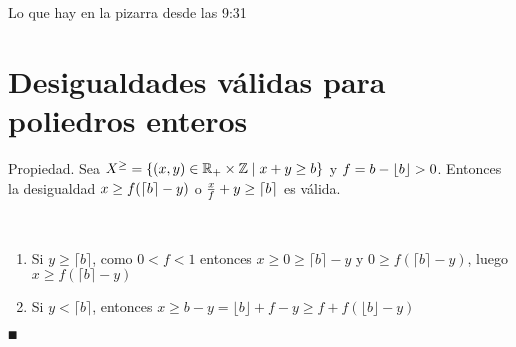 \documentclass[MIOP.tex]{subfiles}
\begin{document}
Lo que hay en la pizarra desde las 9:31


\section{Desigualdades válidas para poliedros enteros}
\begin{propi}
Propiedad. Sea $X^{\geq}=\{(x,y)\in\mathbb{R}_+\times \mathbb{Z} \mid x+y \geq b\}$ y $f= b-\left\lfloor{b}\right\rfloor>0$. Entonces la desigualdad $x\geq f(\left\lceil{b}\right\rceil-y)$ o $\frac{x}{f}+y\geq \left\lceil{b}\right\rceil$ es válida.
\end{propi}

\begin{dem}\
\begin{enumerate}
\item Si $y\geq\lceil b\rceil$, como $0<f<1$ entonces $x\geq 0\geq \lceil b\rceil-y$ y $0\geq f(\lceil b\rceil-y)$, luego $x\geq f(\lceil b\rceil-y)$
\item Si $y<\lceil b\rceil$, entonces $x\geq b-y=\lfloor b\rfloor+f-y\geq f+f(\lfloor b\rfloor-y)$
\end{enumerate}
$\QED$
\end{dem}
\end{document}
